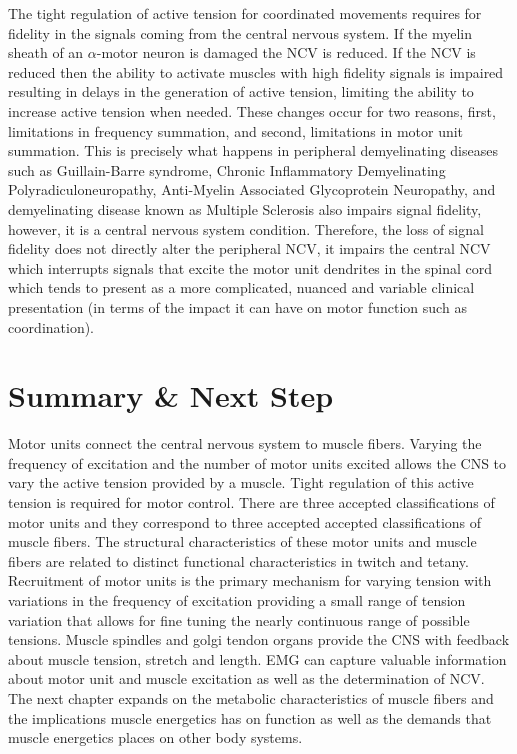 The tight regulation of active tension for coordinated movements requires for fidelity in the signals coming from the central nervous system.\footnotemark{} If the myelin sheath of an $\alpha$-motor neuron is damaged the NCV is reduced. If the NCV is reduced then the ability to activate muscles with high fidelity signals is impaired resulting in delays in the generation of active tension, limiting the ability to increase active tension when needed. These changes occur for two reasons, first, limitations in frequency summation, and second, limitations in motor unit summation. This is precisely what happens in peripheral demyelinating diseases such as Guillain-Barre syndrome, Chronic Inflammatory Demyelinating Polyradiculoneuropathy, Anti-Myelin Associated Glycoprotein Neuropathy, and demyelinating disease known as Multiple Sclerosis also impairs signal fidelity, however, it is a central nervous system condition. Therefore, the loss of signal fidelity does not directly alter the peripheral NCV, it impairs the central NCV which interrupts signals that excite the motor unit dendrites in the spinal cord which tends to present as a more complicated, nuanced and variable clinical presentation (in terms of the impact it can have on motor function such as coordination).


\section{Summary \& Next Step}

Motor units connect the central nervous system to muscle fibers. Varying the frequency of excitation and the number of motor units excited allows the CNS to vary the active tension provided by a muscle. Tight regulation of this active tension is required for motor control. There are three accepted classifications of motor units and they correspond to three accepted accepted classifications of muscle fibers. The structural characteristics of these motor units and muscle fibers are related to distinct functional characteristics in twitch and tetany. Recruitment of motor units is the primary mechanism for varying tension with variations in the frequency of excitation providing a small range of tension variation that allows for fine tuning the nearly continuous range of possible tensions. Muscle spindles and golgi tendon organs provide the CNS with feedback about muscle tension, stretch and length. EMG can capture valuable information about motor unit and muscle excitation as well as the determination of NCV. The next chapter expands on the metabolic characteristics of muscle fibers and the implications muscle energetics has on function as well as the demands that muscle energetics places on other body systems.

\printbibliography[heading=subbibintoc]